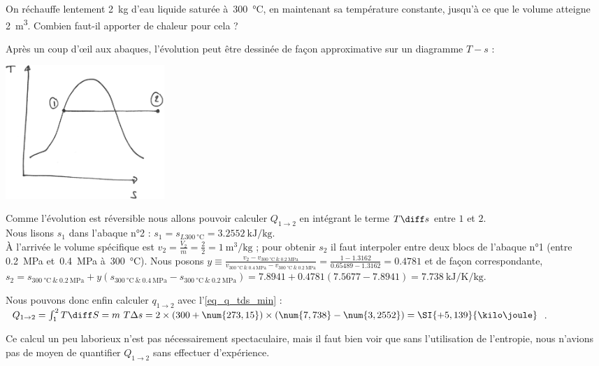		
		\begin{anexample}
			On réchauffe lentement \SI{2}{\kilogram} d’eau liquide saturée à~\SI{300}{\degreeCelsius}, en maintenant sa température constante, jusqu’à ce que le volume atteigne \SI{2}{\metre\cubed}. Combien faut-il apporter de chaleur pour cela ?
			
				\begin{answer}
					Après un coup d’œil aux abaques, l’évolution peut être dessinée de façon approximative sur un diagramme $T-s$ :\\
						\begin{center}\includegraphics[width=6cm]{images/ts_example_5.png}\end{center}
				Comme l’évolution est réversible nous allons pouvoir calculer $Q_{1\to2}$ en intégrant le terme $T \diff s$ entre $1$ et $2$. \\
				Nous lisons $s_1$ dans l’abaque n°2 : $s_1 = s_{L\SI{300}{\degreeCelsius}} = \SI{3,2552}{\kilo\joule\per\kilogram}$.\\
				À l’arrivée le volume spécifique est $v_2 = \frac{V_2}{m} = \frac{2}{2} = \SI{1}{\metre\cubed\per\kilogram} $ ; pour obtenir $s_2$ il faut interpoler entre deux blocs de l’abaque n°1 (entre \SI{0,2}{\mega\pascal} et~\SI{0,4}{\mega\pascal} à~\SI{300}{\degreeCelsius}). 
				Nous posons $y \equiv \frac{v_2 - v_{\SI{300}{\degreeCelsius}~\&~\SI{0,2}{\mega\pascal}}}{v_{\SI{300}{\degreeCelsius}~\&~\SI{0,4}{\mega\pascal}} - v_{\SI{300}{\degreeCelsius}~\&~\SI{0,2}{\mega\pascal}}} = \frac{1 -\num{1,3162}}{\num{0,65489}-\num{1,3162}} = \num{0,4781} $
				et de façon correspondante, $s_2 = s_{\SI{300}{\degreeCelsius}~\&~\SI{0,2}{\mega\pascal}} + y (s_{\SI{300}{\degreeCelsius}~\&~\SI{0,4}{\mega\pascal}} - s_{\SI{300}{\degreeCelsius}~\&~\SI{0,2}{\mega\pascal}}) = \SI{7,8941} + \num{0,4781}(\num{7,5677}-\SI{7,8941}) = \SI{7,738}{\kilo\joule\per\kelvin\per\kilogram} $.
				
				Nous pouvons donc enfin calculer $q_{1\to2}$ avec l’\cref{eq_q_tds_min} : $Q_{1\to2} = 	\int_1^2 T \diff S = m \ T \Delta s = 2 \times (300+\num{273,15})\times(\num{7,738} - \num{3,2552}) = \SI{+5,139}{\kilo\joule} $.
				
				\begin{remark}Ce calcul un peu laborieux n’est pas nécessairement spectaculaire, mais il faut bien voir que sans l’utilisation de l’entropie, nous n’avions pas de moyen de quantifier $Q_{1\to2}$ sans effectuer d’expérience.\end{remark}\end{answer}
		\end{anexample}
		
